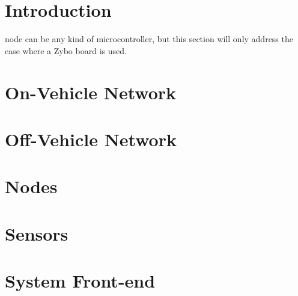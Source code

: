 \section{Introduction}
 node can be any kind of microcontroller, but this section will only address the case where a Zybo board is used. 

\section{On-Vehicle Network}






\section{Off-Vehicle Network}
\label{sec:wifi}

\section{Nodes}

\section{Sensors}

\section{System Front-end}
